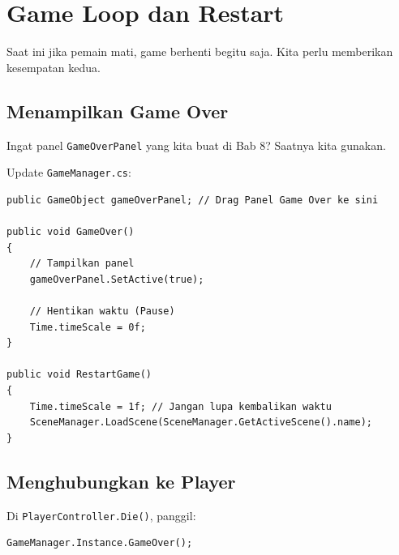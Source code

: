 
\section{Game Loop dan Restart}

Saat ini jika pemain mati, game berhenti begitu saja. Kita perlu memberikan kesempatan kedua.

\subsection{Menampilkan Game Over}
Ingat panel \texttt{GameOverPanel} yang kita buat di Bab 8? Saatnya kita gunakan.

Update \texttt{GameManager.cs}:
\begin{lstlisting}[language={[Sharp]C}]
public GameObject gameOverPanel; // Drag Panel Game Over ke sini

public void GameOver()
{
    // Tampilkan panel
    gameOverPanel.SetActive(true);
    
    // Hentikan waktu (Pause)
    Time.timeScale = 0f; 
}

public void RestartGame()
{
    Time.timeScale = 1f; // Jangan lupa kembalikan waktu
    SceneManager.LoadScene(SceneManager.GetActiveScene().name);
}
\end{lstlisting}

\subsection{Menghubungkan ke Player}
Di \texttt{PlayerController.Die()}, panggil:
\begin{lstlisting}[language={[Sharp]C}]
GameManager.Instance.GameOver();
\end{lstlisting}
